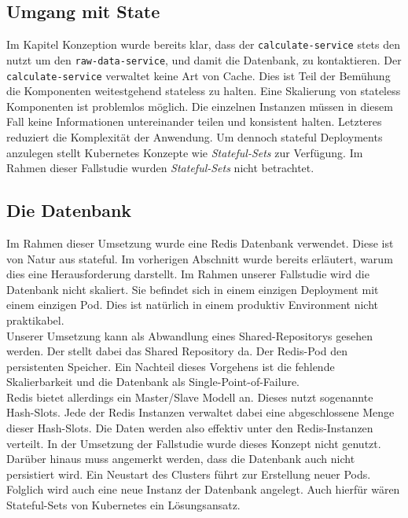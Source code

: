 \subsection{Umgang mit State}
Im Kapitel Konzeption wurde bereits klar, dass der \lstinline{calculate-service} stets den  nutzt um den \lstinline{raw-data-service}, und damit die Datenbank, zu kontaktieren. Der \lstinline{calculate-service} verwaltet keine Art von Cache. Dies ist Teil der Bemühung die Komponenten weitestgehend stateless zu halten. Eine Skalierung von stateless Komponenten ist problemlos möglich. Die einzelnen Instanzen müssen in diesem Fall keine Informationen untereinander teilen und  konsistent halten. Letzteres reduziert die Komplexität der Anwendung. Um dennoch stateful Deployments anzulegen stellt Kubernetes Konzepte wie \textit{Stateful-Sets} zur Verfügung. Im Rahmen dieser Fallstudie wurden\textit{ Stateful-Sets} nicht betrachtet. 
\subsection{Die Datenbank}
Im Rahmen dieser Umsetzung wurde eine Redis Datenbank verwendet. Diese ist von Natur aus stateful. Im vorherigen Abschnitt wurde bereits erläutert, warum dies eine Herausforderung darstellt. Im Rahmen unserer Fallstudie wird die Datenbank nicht skaliert. Sie befindet sich in einem einzigen Deployment mit einem einzigen Pod. Dies ist natürlich in einem produktiv Environment nicht praktikabel. \\
Unserer Umsetzung kann als Abwandlung eines Shared-Repositorys gesehen werden. Der  stellt dabei das Shared Repository da. Der Redis-Pod den persistenten Speicher. Ein Nachteil dieses Vorgehens ist die fehlende Skalierbarkeit und die Datenbank als Single-Point-of-Failure.\\
Redis bietet allerdings ein Master/Slave Modell an. Dieses nutzt sogenannte Hash-Slots. Jede der Redis Instanzen verwaltet dabei eine abgeschlossene Menge dieser Hash-Slots. Die Daten werden also effektiv unter den Redis-Instanzen verteilt. In der Umsetzung der Fallstudie wurde dieses Konzept nicht genutzt. \\
Darüber hinaus muss angemerkt werden, dass die Datenbank auch nicht persistiert wird. Ein Neustart des Clusters führt zur Erstellung neuer Pods. Folglich wird auch eine neue Instanz der Datenbank angelegt. Auch hierfür wären Stateful-Sets von Kubernetes ein Lösungsansatz. 
















